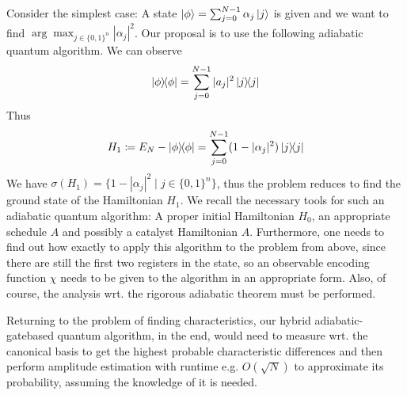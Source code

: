 \documentclass[10pt]{amsart}
\theoremstyle{definition}
\theoremstyle{remark}
\begin{document}
    Consider the simplest case: A state \(\ket{\phi} = \sum_{j = 0}^{N-1} \alpha_j \ket{j}\) is given and we want to find \(\arg\max_{j \in \{0, 1\}^n} |\alpha_j|^2\). Our proposal is to use the following adiabatic quantum algorithm. We can observe
    \begin{align}
        \ketbra{\phi}{\phi} = \sum_{j=0}^{N-1} |a_j|^2 \ketbra{j}{j}
    \end{align}
    Thus
    \begin{align}
        H_1 \coloneqq E_N-\ketbra{\phi}{\phi} = \sum_{j=0}^{N-1} (1-|\alpha_j|^2) \ketbra{j}{j}
    \end{align}
    We have \(\sigma(H_1) = \{1 - |\alpha_j|^2 \mid j \in \{0, 1\}^n\}\), thus the problem reduces to find the ground state of the Hamiltonian \(H_1\). We recall the necessary tools for such an adiabatic quantum algorithm: A proper initial Hamiltonian \(H_0\), an appropriate schedule \(A\) and possibly a catalyst Hamiltonian \(A\). Furthermore, one needs to find out how exactly to apply this algorithm to the problem from above, since there are still the first two registers in the state, so an observable encoding function \(\chi\) needs to be given to the algorithm in an appropriate form. Also, of course, the analysis wrt. the rigorous adiabatic theorem must be performed.

    Returning to the problem of finding characteristics, our hybrid adiabatic-gatebased quantum algorithm, in the end, would need to measure wrt. the canonical basis to get the highest probable characteristic differences and then perform amplitude estimation with runtime e.g. \(O(\sqrt{N})\) \cite[pp. 19-20]{Brassard} to approximate its probability, assuming the knowledge of it is needed.
\end{document}
